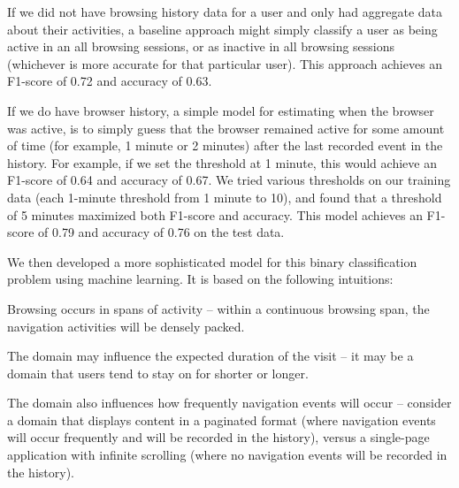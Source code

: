\documentclass{sigchi}
\begin{document}
If we did not have browsing history data for a user and only had aggregate data about their activities, a baseline approach might simply classify a user as being active in an all browsing sessions, or as inactive in all browsing sessions (whichever is more accurate for that particular user). This approach achieves an F1-score of 0.72 and accuracy of 0.63.


If we do have browser history, a simple model for estimating when the browser was active, is to simply guess that the browser remained active for some amount of time (for example, 1 minute or 2 minutes) after the last recorded event in the history. For example, if we set the threshold at 1 minute, this would achieve an F1-score of 0.64 and accuracy of 0.67. We tried various thresholds on our training data (each 1-minute threshold from 1 minute to 10), and found that a threshold of 5 minutes maximized both F1-score and accuracy. This model achieves an F1-score of 0.79 and accuracy of 0.76 on the test data.






We then developed a more sophisticated model for this binary classification problem using machine learning. It is based on the following intuitions:

\begin{compactitem}
	\item Browsing occurs in spans of activity -- within a continuous browsing span, the navigation activities will be densely packed.
	\item The domain may influence the expected duration of the visit -- it may be a domain that users tend to stay on for shorter or longer.
	\item The domain also influences how frequently navigation events will occur -- consider a domain that displays content in a paginated format (where navigation events will occur frequently and will be recorded in the history), versus a single-page application with infinite scrolling (where no navigation events will be recorded in the history).
\end{compactitem}
\end{document}
